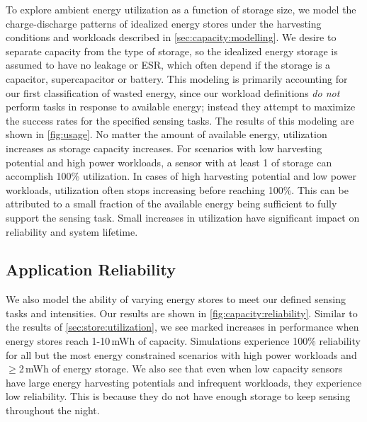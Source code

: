 To explore ambient energy utilization as a function of storage size, we
model the charge-discharge patterns of idealized energy stores under
the harvesting conditions and workloads described in \cref{sec:capacity:modelling}.
We desire to separate capacity from the type of storage, so the
idealized energy storage is assumed to have no leakage or ESR, which often depend if the storage is a capacitor, supercapacitor or battery. 
This modeling is primarily accounting for our first classification of
wasted energy, since our workload definitions \textit{do not} perform
tasks in response to available energy; instead they attempt to maximize the success
rates for the specified sensing tasks.
The results of this modeling are shown in \cref{fig:usage}. 
No matter
the amount of available energy, utilization increases as
storage capacity increases. For scenarios with low harvesting potential and high
power workloads, a sensor with at least 1\ssi{\milli\Wh} of storage can accomplish 100\% utilization.
In cases of
high harvesting potential and low power workloads, utilization often
stops increasing before reaching 100\%. This
can be attributed to a small fraction of the available energy being sufficient
to fully support the sensing task.
Small increases in utilization
have significant impact on reliability and system lifetime.

\subsection{Application Reliability}
\label{sec:store:reliability}

We also model the ability of varying energy stores to meet our defined
sensing tasks and intensities. Our results are
shown in \cref{fig:capacity:reliability}. 
Similar to the results of \cref{sec:store:utilization}, we see marked
increases in performance when energy stores reach 1-10\,mWh
of capacity.
Simulations experience 100\% reliability for all but
the most energy constrained scenarios with high power workloads and
$\geq$2\,mWh of energy storage.
We also see that even when low capacity sensors
have large energy harvesting potentials and infrequent workloads, they experience low
reliability.
This is because they
do not have enough storage to keep sensing throughout the night.

